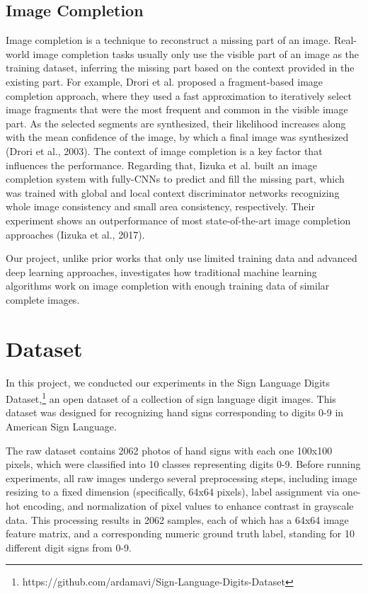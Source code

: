 \documentclass{article}
\begin{document}
\subsection{Image Completion}
Image completion is a technique to reconstruct a missing part of an image. Real-world image completion tasks usually only use the visible part of an image as the training dataset, inferring the missing part based on the context provided in the existing part. For example, Drori et al. proposed a fragment-based image completion approach, where they used a fast approximation to iteratively select image fragments that were the most frequent and common in the visible image part. As the selected segments are synthesized, their likelihood increases along with the mean confidence of the image, by which a final image was synthesized (Drori et al., 2003). The context of image completion is a key factor that influences the performance. Regarding that, Iizuka et al. built an image completion system with fully-CNNs to predict and fill the missing part, which was trained with global and local context discriminator networks recognizing whole image consistency and small area consistency, respectively. Their experiment shows an outperformance of most state-of-the-art image completion approaches (Iizuka et al., 2017). 

Our project, unlike prior works that only use limited training data and advanced deep learning approaches, investigates how traditional machine learning algorithms work on image completion with enough training data of similar complete images.

\section{Dataset}
In this project, we conducted our experiments in the Sign Language Digits Dataset,\footnote{https://github.com/ardamavi/Sign-Language-Digits-Dataset} an open dataset of a collection of sign language digit images. This dataset was designed for recognizing hand signs corresponding to digits 0-9 in American Sign Language. 

The raw dataset contains 2062 photos of hand signs with each one 100x100 pixels, which were classified into 10 classes representing digits 0-9. Before running experiments, all raw images undergo several preprocessing steps, including image resizing to a fixed dimension (specifically, 64x64 pixels), label assignment via one-hot encoding, and normalization of pixel values to enhance contrast in grayscale data. This processing results in 2062 samples, each of which has a 64x64 image feature matrix, and a corresponding numeric ground truth label, standing for 10 different digit signs from 0-9.
\end{document}

